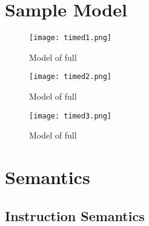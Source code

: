 \chapter{Sample Model}
\begin{figure}
  \texttt{[image: timed1.png]}
  \caption{Model of full \jcl}
\end{figure}
\begin{figure}
  \texttt{[image: timed2.png]}
  \caption{Model of full \jcl}
\end{figure}
\begin{figure}
  \texttt{[image: timed3.png]}
  \caption{Model of full \jcl}
\end{figure}

\chapter{Semantics}\label{chap:semantics}

\section{Instruction Semantics}


